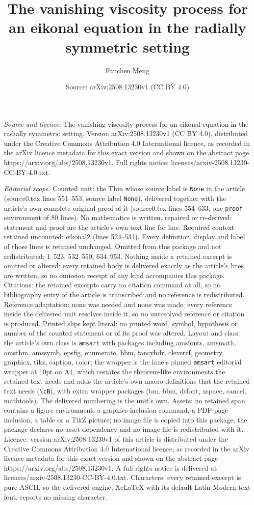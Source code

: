 \documentclass[10pt,a4paper]{amsart}
\title[The vanishing viscosity process for an eikonal equation in t]{The vanishing viscosity process for an eikonal equation in the radially symmetric setting}
\author{Fanchen Meng}
\date{Source: arXiv:2508.13230v1 (CC BY 4.0)}
\begin{document}
\maketitle

\noindent\emph{Source and licence.} The vanishing viscosity process for an eikonal equation in the radially symmetric setting. Version arXiv:2508.13230v1 (CC BY 4.0), distributed under the Creative Commons Attribution 4.0 International licence, as recorded in the arXiv licence metadata for this exact version and shown on the abstract page https://arxiv.org/abs/2508.13230v1. Full rights notice: licenses/arxiv-2508.13230-CC-BY-4.0.txt.\par\smallskip

\noindent\textit{Editorial scope.} Counted unit: the Thm whose source label is \texttt{None} in the article (source0.tex lines 551--553, source label \texttt{None}), delivered together with the article's own complete original proof of it (source0.tex lines 554--633, one \texttt{proof} environment of 80 lines). No mathematics is written, repaired or re-derived: statement and proof are the article's own text line for line. Required context retained uncounted: eikonal2 (lines 524--531). Every definition, display and label of those lines is retained unchanged. Omitted from this package and not redistributed: 1--523, 532--550, 634--953. Nothing inside a retained excerpt is omitted or altered: every retained body is delivered exactly as the article's lines are written, so no omission receipt of any kind accompanies this package. Citations: the retained excerpts carry no citation command at all, so no bibliography entry of the article is transcribed and no reference is redistributed. Reference adaptation: none was needed and none was made; every reference inside the delivered unit resolves inside it, so no unresolved reference or citation is produced. Printed slips kept literal: no printed word, symbol, hypothesis or number of the counted statement or of its proof was altered. Layout and class: the article's own class is \texttt{amsart} with packages including amsfonts, amsmath, amsthm, amssymb, epsfig, enumerate, bbm, fancyhdr, cleveref, geometry, graphicx, tikz, caption, color; the wrapper is the lane's pinned \texttt{amsart} editorial wrapper at 10pt on A4, which restates the theorem-like environments the retained text needs and adds the article's own macro definitions that the retained text needs (\texttt{\textbackslash cB}), with extra wrapper packages (bm, bbm, dsfont, xspace, cancel, mathtools). The delivered numbering is the unit's own. Assets: no retained span contains a figure environment, a graphics-inclusion command, a PDF-page inclusion, a table or a TikZ picture; no image file is copied into this package, the package declares no asset dependency and no image file is redistributed with it. Licence: version arXiv:2508.13230v1 of this article is distributed under the Creative Commons Attribution 4.0 International licence, as recorded in the arXiv licence metadata for this exact version and shown on the abstract page https://arxiv.org/abs/2508.13230v1. A full rights notice is delivered at licenses/arxiv-2508.13230-CC-BY-4.0.txt. Characters: every retained excerpt is pure ASCII, so the delivered engine, XeLaTeX with its default Latin Modern text font, reports no missing character.
\end{document}
